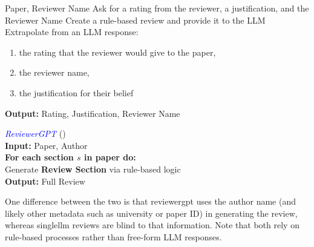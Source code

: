 \documentclass{article} %
\begin{document}
\begin{minipage}[t]{0.52\textwidth}
\begin{algorithmic}[1]
     Paper, Reviewer Name
    \STATE Ask for a rating from the reviewer, a justification, and the Reviewer Name
    \STATE Create a rule-based review and provide it to the LLM
    \STATE Extrapolate from an LLM response:
    \begin{enumerate}
        \item the rating that the reviewer would give to the paper,
        \item the reviewer name,
        \item the justification for their belief
    \end{enumerate}
    \STATE \textbf{Output:} Rating, Justification, Reviewer Name
\end{algorithmic}
\end{minipage}
\hfill
\begin{minipage}[t]{0.45\textwidth}
\textcolor{blue}{\textit{ReviewerGPT}} (\textit{\reviewergpt}) \\[0.5em]
\textcolor{myyellow}{\textbf{Input:}} Paper, Author \\[0.3em]
\textbf{For each section $s$ in paper do:} \\
\quad Generate \textcolor{myyellow}{\textbf{Review Section}} via rule-based logic \\[0.3em]
\textcolor{myyellow}{\textbf{Output:}} Full Review
\end{minipage}

\vspace{1em}

One difference between the two is that reviewergpt uses the author name (and likely other metadata such as university or paper ID) in generating the review, whereas singlellm reviews are blind to that information. Note that both rely on rule-based processes rather than free-form LLM responses.
\end{document}

